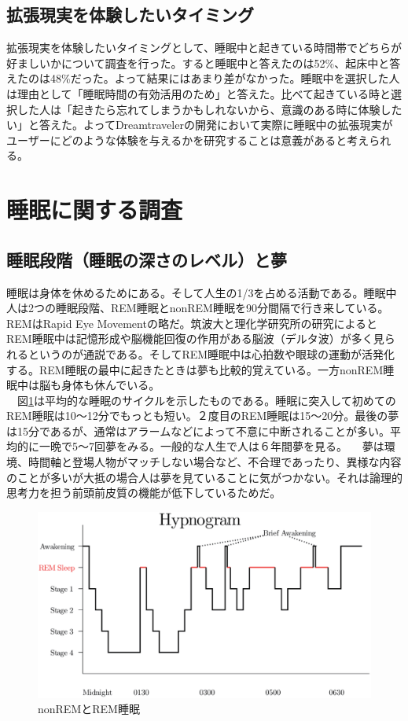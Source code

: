 \subsection{拡張現実を体験したいタイミング}
拡張現実を体験したいタイミングとして、睡眠中と起きている時間帯でどちらが好ましいかについて調査を行った。すると睡眠中と答えたのは52\%、起床中と答えたのは48\%だった。よって結果にはあまり差がなかった。睡眠中を選択した人は理由として「睡眠時間の有効活用のため」と答えた。比べて起きている時と選択した人は「起きたら忘れてしまうかもしれないから、意識のある時に体験したい」と答えた。よってDreamtravelerの開発において実際に睡眠中の拡張現実がユーザーにどのような体験を与えるかを研究することは意義があると考えられる。


\section{睡眠に関する調査}
\subsection{睡眠段階（睡眠の深さのレベル）と夢}
睡眠は身体を休めるためにある。そして人生の1/3を占める活動である。睡眠中人は2つの睡眠段階、REM睡眠とnonREM睡眠を90分間隔で行き来している\cite{Dement}。REMはRapid Eye Movementの略だ。筑波大と理化学研究所の研究によるとREM睡眠中は記憶形成や脳機能回復の作用がある脳波（デルタ波）が多く見られるというのが通説である\cite{tsukuba}。そしてREM睡眠中は心拍数や眼球の運動が活発化する。REM睡眠の最中に起きたときは夢も比較的覚えている\cite{remNonRem}。一方nonREM睡眠中は脳も身体も休んでいる。\\
　図\ref{SleepHypnogram}は平均的な睡眠のサイクルを示したものである。睡眠に突入して初めてのREM睡眠は10〜12分でもっとも短い。２度目のREM睡眠は15〜20分。最後の夢は15分であるが、通常はアラームなどによって不意に中断されることが多い。平均的に一晩で5〜7回夢をみる。一般的な人生で人は６年間夢を見る。
　夢は環境、時間軸と登場人物がマッチしない場合など、不合理であったり、異様な内容のことが多いが大抵の場合人は夢を見ていることに気がつかない。それは論理的思考力を担う前頭前皮質の機能が低下しているためだ\cite{cortex}。

\begin{figure}[htbp]
\begin{center}
\includegraphics[width=15cm]{eps/SleepHypnogram.eps}
\caption{nonREMとREM睡眠}
\label{SleepHypnogram}
\end{center}
\end{figure}

